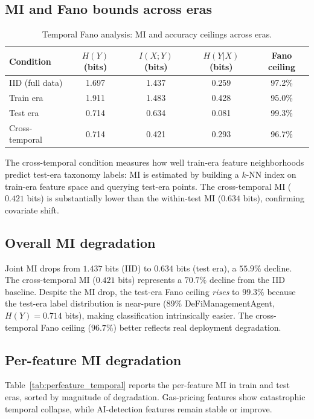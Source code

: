 \documentclass[11pt,a4paper]{article}
\renewcommand{\_}{\oldunderscore\allowbreak}
\begin{document}
\subsection{MI and Fano bounds across eras}

\begin{table}[h]
\centering
\caption{Temporal Fano analysis: MI and accuracy ceilings across eras.}
\label{tab:temporal_fano}
\begin{tabular}{lcccc}
\toprule
\textbf{Condition} & $H(Y)$ \textbf{(bits)} & $I(X;Y)$ \textbf{(bits)} & $H(Y|X)$ \textbf{(bits)} & \textbf{Fano ceiling} \\
\midrule
IID (full data)  & 1.697 & 1.437 & 0.259 & 97.2\% \\
Train era        & 1.911 & 1.483 & 0.428 & 95.0\% \\
Test era         & 0.714 & 0.634 & 0.081 & 99.3\% \\
Cross-temporal   & 0.714 & 0.421 & 0.293 & 96.7\% \\
\bottomrule
\end{tabular}
\end{table}

The cross-temporal condition measures how well train-era feature
neighborhoods predict test-era taxonomy labels: MI is estimated by
building a $k$-NN index on train-era feature space and querying
test-era points. The cross-temporal MI ($0.421$ bits) is substantially
lower than the within-test MI ($0.634$ bits), confirming covariate
shift.

\subsection{Overall MI degradation}

Joint MI drops from $1.437$ bits (IID) to $0.634$ bits (test era),
a $55.9\%$ decline. The cross-temporal MI ($0.421$ bits) represents a
$70.7\%$ decline from the IID baseline. Despite the MI drop, the
test-era Fano ceiling \emph{rises} to $99.3\%$ because the test-era
label distribution is near-pure (89\% DeFiManagementAgent, $H(Y) = 0.714$
bits), making classification intrinsically easier. The cross-temporal
Fano ceiling ($96.7\%$) better reflects real deployment degradation.

\subsection{Per-feature MI degradation}

Table~\ref{tab:perfeature_temporal} reports the per-feature MI in
train and test eras, sorted by magnitude of degradation. Gas-pricing
features show catastrophic temporal collapse, while AI-detection
features remain stable or improve.
\end{document}
